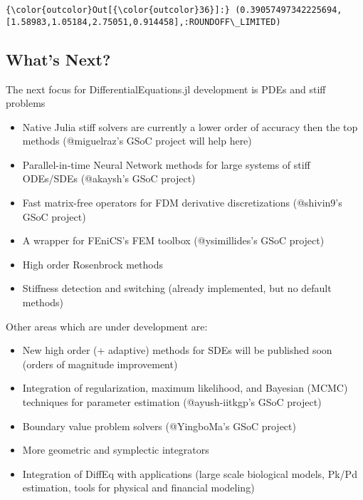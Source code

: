 \documentclass[11pt]{article}
\begin{document}
            \begin{Verbatim}[commandchars=\\\{\}]
{\color{outcolor}Out[{\color{outcolor}36}]:} (0.39057497342225694,[1.58983,1.05184,2.75051,0.914458],:ROUNDOFF\_LIMITED)
\end{Verbatim}
        
    \subsection{What's Next?}\label{whats-next}

The next focus for DifferentialEquations.jl development is PDEs and
stiff problems

\begin{itemize}
\itemsep1pt\parskip0pt
\item
  Native Julia stiff solvers are currently a lower order of accuracy
  then the top methods (@miguelraz's GSoC project will help here)
\item
  Parallel-in-time Neural Network methods for large systems of stiff
  ODEs/SDEs (@akaysh's GSoC project)
\item
  Fast matrix-free operators for FDM derivative discretizations
  (@shivin9's GSoC project)
\item
  A wrapper for FEniCS's FEM toolbox (@ysimillides's GSoC project)
\item
  High order Rosenbrock methods
\item
  Stiffness detection and switching (already implemented, but no default
  methods)
\end{itemize}

    Other areas which are under development are:

\begin{itemize}
\itemsep1pt\parskip0pt
\item
  New high order (+ adaptive) methods for SDEs will be published soon
  (orders of magnitude improvement)
\item
  Integration of regularization, maximum likelihood, and Bayesian (MCMC)
  techniques for parameter estimation (@ayush-iitkgp's GSoC project)
\item
  Boundary value problem solvers (@YingboMa's GSoC project)
\item
  More geometric and symplectic integrators
\item
  Integration of DiffEq with applications (large scale biological
  models, Pk/Pd estimation, tools for physical and financial modeling)
\end{itemize}


    
    
    
    
\end{document}
